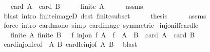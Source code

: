 \begin{isabellebody}
\ \ \ {\isachardoublequoteopen}card\ A\ {\isasymle}\ card\ B{\isachardoublequoteclose}\isanewline
%
\isadelimproof
%
\endisadelimproof
%
\isatagproof
{}\isamarkupfalse%
\ {\isacharminus}{\kern0pt}\isanewline
\ \ \isamarkupfalse%
\ {\isachardoublequoteopen}finite\ A{\isachardoublequoteclose}\isanewline
\ \ \ \ \isamarkupfalse%
\ assms\ \isamarkupfalse%
\ {\isacharparenleft}{\kern0pt}blast\ intro{\isacharcolon}{\kern0pt}\ finite{\isacharunderscore}{\kern0pt}imageD\ dest{\isacharcolon}{\kern0pt}\ finite{\isacharunderscore}{\kern0pt}subset{\isacharparenright}{\kern0pt}\isanewline
\ \ \isamarkupfalse%
\ \isamarkupfalse%
\ {\isacharquery}{\kern0pt}thesis\isanewline
\ \ \ \ \isamarkupfalse%
\ assms\ \isamarkupfalse%
\ {\isacharparenleft}{\kern0pt}force\ intro{\isacharcolon}{\kern0pt}\ card{\isacharunderscore}{\kern0pt}mono\ simp{\isacharcolon}{\kern0pt}\ card{\isacharunderscore}{\kern0pt}image\ {\isacharbrackleft}{\kern0pt}symmetric{\isacharbrackright}{\kern0pt}{\isacharparenright}{\kern0pt}\isanewline
{}\isamarkupfalse%
%
\endisatagproof
{\isafoldproof}%
%
\isadelimproof
\isanewline
%
\endisadelimproof
\isanewline
{}\isamarkupfalse%
\ inj{\isacharunderscore}{\kern0pt}on{\isacharunderscore}{\kern0pt}iff{\isacharunderscore}{\kern0pt}card{\isacharunderscore}{\kern0pt}le{\isacharcolon}{\kern0pt}\isanewline
\ \ {\isachardoublequoteopen}{\isasymlbrakk}\ finite\ A{\isacharsemicolon}{\kern0pt}\ finite\ B\ {\isasymrbrakk}\ {\isasymLongrightarrow}\ {\isacharparenleft}{\kern0pt}{\isasymexists}f{\isachardot}{\kern0pt}\ inj{\isacharunderscore}{\kern0pt}on\ f\ A\ {\isasymand}\ f\ {\isacharbackquote}{\kern0pt}\ A\ {\isasymle}\ B{\isacharparenright}{\kern0pt}\ {\isacharequal}{\kern0pt}\ {\isacharparenleft}{\kern0pt}card\ A\ {\isasymle}\ card\ B{\isacharparenright}{\kern0pt}{\isachardoublequoteclose}\isanewline
%
\isadelimproof
%
\endisadelimproof
%
\isatagproof
{}\isamarkupfalse%
\ card{\isacharunderscore}{\kern0pt}inj{\isacharunderscore}{\kern0pt}on{\isacharunderscore}{\kern0pt}le{\isacharbrackleft}{\kern0pt}of\ {\isacharunderscore}{\kern0pt}\ A\ B{\isacharbrackright}{\kern0pt}\ card{\isacharunderscore}{\kern0pt}le{\isacharunderscore}{\kern0pt}inj{\isacharbrackleft}{\kern0pt}of\ A\ B{\isacharbrackright}{\kern0pt}\ \isamarkupfalse%
\ blast%
\endisatagproof
{\isafoldproof}%
%
\isadelimproof
\isanewline
%
\endisadelimproof
\isanewline
{}\isamarkupfalse%

\end{isabellebody}
